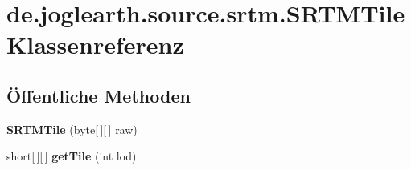 \section{de.\-joglearth.\-source.\-srtm.\-S\-R\-T\-M\-Tile Klassenreferenz}
\label{classde_1_1joglearth_1_1source_1_1srtm_1_1_s_r_t_m_tile}
\subsection*{Öffentliche Methoden}
\begin{DoxyCompactItemize}
\item 
{\bfseries S\-R\-T\-M\-Tile} (byte[$\,$][$\,$] raw)\label{classde_1_1joglearth_1_1source_1_1srtm_1_1_s_r_t_m_tile_aa53ac6f4006d9e77deaf3f097722afec}

\item 
short[$\,$][$\,$] {\bfseries get\-Tile} (int lod)\label{classde_1_1joglearth_1_1source_1_1srtm_1_1_s_r_t_m_tile_aee10576cfcf9c6001e8eaaa668736e24}

\end{DoxyCompactItemize}
